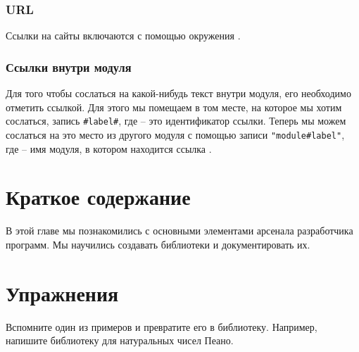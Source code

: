 \subsubsection{URL}

Ссылки на сайты включаются с помощью окружения .

\subsubsection{Ссылки внутри модуля}

Для того чтобы сослаться на какой-нибудь текст внутри
модуля, его необходимо отметить ссылкой. Для этого 
мы помещаем в том месте, на которое мы хотим сослаться,
запись \texttt{\#label\#}, где  -- это идентификатор 
ссылки. Теперь мы можем сослаться на это место из другого
модуля с помощью записи \texttt{"module\#label"}, где 
-- имя модуля, в котором находится ссылка .

\section{Краткое содержание}

В этой главе мы познакомились с основными элементами
арсенала разработчика программ. Мы научились создавать 
библиотеки и документировать их.

\section{Упражнения}

Вспомните один из примеров и превратите его в библиотеку.
Например, напишите библиотеку для натуральных чисел Пеано.
